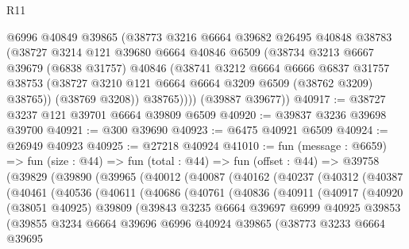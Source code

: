 \begin{lexlean}{R11}
\begin{coremodule}
          @6996
          @40849
          @39865
          (@38773
            @3216
            @6664
            @39682
            @26495
            @40848
            @38783
            (@38727
              @3214
              @121
              @39680
              @6664
              @40846
              @6509
              (@38734
                @3213
                @6667
                @39679
                (@6838 @31757)
                @40846
                (@38741
                  @3212
                  @6664
                  @6666
                  @6837
                  @31757
                  @38753
                  (@38727 @3210 @121 @6664 @6664 @3209 @6509 (@38762 @3209) @38765))
                (@38769 @3208))
              @38765))))
      (@39887 @39677))
@40917 := @38727 @3237 @121 @39701 @6664 @39809 @6509
@40920 := @39837 @3236 @39698 @39700
@40921 := @300 @39690
@40923 := @6475 @40921 @6509
@40924 := @26949 @40923
@40925 := @27218 @40924
@41010 := fun (message : @6659) =>
  fun (size : @44) =>
  fun (total : @44) =>
  fun (offset : @44) =>
  @39758
    (@39829
      (@39890
        (@39965
          (@40012
            (@40087
              (@40162
                (@40237
                  (@40312
                    (@40387
                      (@40461
                        (@40536
                          (@40611
                            (@40686
                              (@40761
                                (@40836
                                  (@40911
                                    (@40917
                                      (@40920
                                        (@38051 @40925)
                                        @39809
                                        (@39843
                                          @3235
                                          @6664
                                          @39697
                                          @6999
                                          @40925
                                          @39853
                                          (@39855
                                            @3234
                                            @6664
                                            @39696
                                            @6996
                                            @40924
                                            @39865
                                            (@38773
                                              @3233
                                              @6664
                                              @39695

\end{coremodule}
\end{lexlean}
